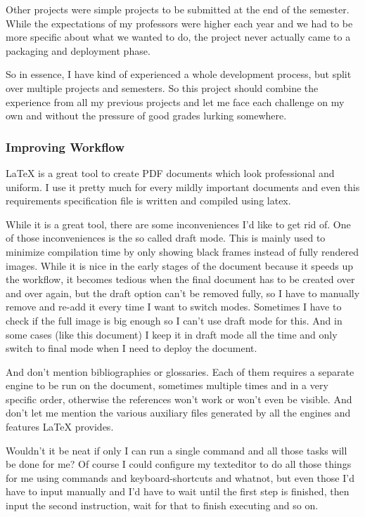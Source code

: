 Other projects were simple projects to be submitted at the end of the semester.
While the expectations of my professors were higher each year and we had to be
more specific about what we wanted to do, the project never actually came to a
packaging and deployment phase.

So in essence, I have kind of experienced a whole development process, but
split over multiple projects and semesters. So this project should combine the
experience from all my previous projects and let me face each challenge on my
own and without the pressure of good grades lurking somewhere.

\subsubsection*{Improving Workflow}
{\LaTeX} is a great tool to create PDF documents which look professional
and uniform. I use it pretty much for every mildly important documents and
even this requirements specification file is written and compiled using latex.

While it is a great tool, there are some inconveniences I'd like to get rid of.
One of those inconveniences is the so called {\glqq draft mode\grqq}. This is
mainly used to minimize compilation time by only showing black frames instead
of fully rendered images. While it is nice in the early stages of the document
because it speeds up the workflow, it becomes tedious when the final document
has to be created over and over again, but the draft option can't be removed 
fully, so I have to manually remove and re-add it every time I want to switch
modes. Sometimes I have to check if the full image is big enough so I can't
use draft mode for this. And in some cases (like this document) I keep it in
draft mode all the time and only switch to final mode when I need to deploy the
document.

And don't mention bibliographies or glossaries. Each of them requires a
separate engine to be run on the document, sometimes multiple times and in a
very specific order, otherwise the references won't work or won't even be
visible. And don't let me mention the various auxiliary files generated by all
the engines and features {\LaTeX} provides.

Wouldn't it be neat if only I can run a single command and all those tasks will
be done for me? Of course I could configure my texteditor to do all those
things for me using commands and keyboard-shortcuts and whatnot, but even those
I'd have to input manually and I'd have to wait until the first step is
finished, then input the second instruction, wait for that to finish executing
and so on.


